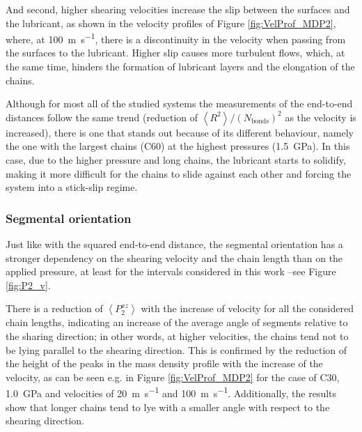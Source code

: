 \documentclass[aps,prb,reprint,superscriptaddress, a4paper]{revtex4-1}
\begin{document}
And second,   higher shearing velocities increase the slip between the surfaces and the lubricant, as shown in the velocity profiles of Figure \ref{fig:VelProf_MDP2}, where, at \SI{100}{\meter\per\second}, there is a discontinuity in the velocity when passing from the surfaces to the lubricant. Higher slip causes more turbulent flows, which,   at the same time, hinders the formation of lubricant layers and the elongation of the chains.


Although for most all of the studied systems the measurements of the end-to-end distances follow the same trend (reduction of  $\left< R^2 \right>/\left(N_\text{bonds}\right)^2$ as the velocity is increased), there is one that stands out because of its different behaviour, namely the one with the largest chains (C60) at the highest pressures (\SI{1.5}{\giga\pascal}). In this case, due to the higher pressure and long chains, the lubricant starts to solidify, making it more difficult for the chains to slide against each other and forcing the system into a stick-slip regime.  

\subsubsection{Segmental orientation}


Just like with the squared end-to-end distance,  the segmental orientation has a stronger dependency on the shearing velocity and the chain length than on the applied pressure, at least for the intervals considered in this work --see Figure \ref{fig:P2_v}. 

There is a reduction of  $\left<P_{2}^{xz} \right> $ with the increase of velocity for all the considered chain lengths, indicating an increase of the average  angle of segments relative  to the sharing direction; in other words, at higher velocities, the chains tend not to be lying parallel to the shearing direction. This is confirmed by the reduction of the height of the peaks in the  mass density profile with the increase of the velocity, as can be seen e.g.  in Figure  \ref{fig:VelProf_MDP2} for the case of C30, \SI{1.0}{\giga\pascal} and velocities of  \SI{20}{\meter\per\second} and  \SI{100}{\meter\per\second}. Additionally, the results show that longer chains tend to  lye  with a smaller angle with respect to the shearing direction.
\end{document}
